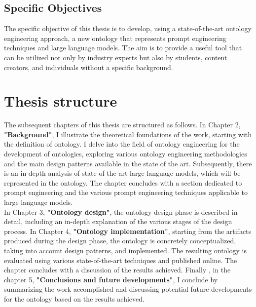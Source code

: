 \subsection{Specific Objectives}
The specific objective of this thesis is to develop, using a state-of-the-art ontology engineering approach, a new ontology that represents prompt engineering techniques and large language models. The aim is to provide a useful tool that can be utilized not only by industry experts but also by students, content creators, and individuals without a specific background.


\section{Thesis structure}
The subsequent chapters of this thesis are structured as follows. In Chapter 2, \textbf{"Background"}, I illustrate the theoretical foundations of the work, starting with the definition of ontology. I delve into the field of ontology engineering for the development of ontologies, exploring various ontology engineering methodologies and the main design patterns available in the state of the art. Subsequently, there is an in-depth analysis of state-of-the-art large language models, which will be represented in the ontology. The chapter concludes with a section dedicated to prompt engineering and the various prompt engineering techniques applicable to large language models.\\
In Chapter 3, \textbf{"Ontology design"}, the ontology design phase is described in detail, including an in-depth explanation of the various stages of the design process. In Chapter 4, \textbf{"Ontology implementation"}, starting from the artifacts produced during the design phase, the ontology is concretely conceptualized, taking into account design patterns, and implemented. The resulting ontology is evaluated using various state-of-the-art techniques and published online. The chapter concludes with a discussion of the results achieved. Finally , in the chapter 5, \textbf{"Conclusions and future developments"}, I conclude by summarizing the work accomplished and discussing potential future developments for the ontology based on the results achieved.